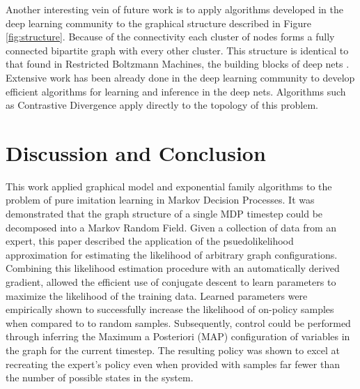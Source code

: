 \documentclass{article} %
\begin{document}
Another interesting vein of future work is to apply algorithms developed in the deep learning community to the graphical structure described in Figure \ref{fig:structure}. Because of the connectivity each cluster of nodes forms a fully connected bipartite graph with every other cluster. This structure is identical to that found in Restricted Boltzmann Machines, the building blocks of deep nets \cite{ackley85}. Extensive work has been already done in the deep learning community to develop efficient algorithms for learning and inference in the deep nets. Algorithms such as Contrastive Divergence \cite{hinton02} apply directly to the topology of this problem. 

\section{Discussion and Conclusion}
This work applied graphical model and exponential family algorithms to the problem of pure imitation learning in Markov Decision Processes. It was demonstrated that the graph structure of a single MDP timestep could be decomposed into a Markov Random Field. Given a collection of data from an expert, this paper described the application of the psuedolikelihood approximation for estimating the likelihood of arbitrary graph configurations. Combining this likelihood estimation procedure with an automatically derived gradient, allowed the efficient use of conjugate descent to learn parameters to maximize the likelihood of the training data. Learned parameters were empirically shown to successfully increase the likelihood of on-policy samples when compared to to random samples. Subsequently, control could be performed through inferring the Maximum a Posteriori (MAP) configuration of variables in the graph for the current timestep. The resulting policy was shown to excel at recreating the expert's policy even when provided with samples far fewer than the number of possible states in the system. 



\end{document}
